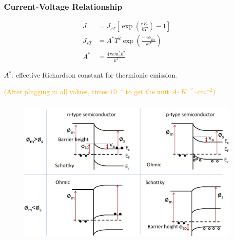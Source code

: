 \documentclass{beamer}
\begin{document}
    \begin{frame} \frametitle{Current-Voltage Relationship}
        \begin{equation*}
            \begin{aligned}
                J &= J_{sT} \left[ \exp\left( \frac{eV_a}{kT}  \right) - 1 \right] \\
                J_{sT} &= A^* T^2 \exp \left( \frac{-e \phi_{Bn} }{kT}  \right) \\
                A^* &= \frac{4\pi e m_n^* k^2}{h^3} 
            \end{aligned}
        \end{equation*}
        \par $A^*$: effective Richardson constant for thermionic emission.
        \par \textcolor{orange}{(After plugging in all values, times $10^{-4}$ to get the unit $A \cdot K^{-2} \cdot cm^{-2}$)}
    \end{frame}

    \begin{frame} \frametitle{}
        \begin{figure}[H]
            \centering
            \includegraphics[width=\linewidth]{Types-of-semiconductor.jpg}
            \label{fig:Types-of-semiconductor.jpg}
        \end{figure}
    \end{frame}
\end{document}
